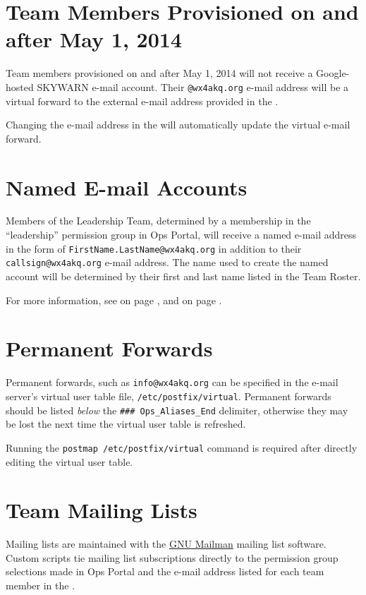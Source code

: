 \documentclass[pdflatex,letterpaper,twoside,12pt]{book}
\begin{document}
\section{Team Members Provisioned on and after May 1, 2014}

Team members provisioned on and after May 1, 2014 will not receive a Google-hosted SKYWARN e-mail account.  Their \texttt{@wx4akq.org} e-mail address will be a virtual forward to the external e-mail address provided in the .

Changing the e-mail address in the  will automatically update the virtual e-mail forward.

\section{Named E-mail Accounts}\label{named-email}

Members of the Leadership Team, determined by a membership in the ``leadership'' permission group in Ops Portal, will receive a named e-mail address in the form of \texttt{FirstName.LastName@wx4akq.org} in addition to their \texttt{callsign@wx4akq.org} e-mail address.  The name used to create the named account will be determined by their first and last name listed in the Team Roster.

For more information, see  on page \pageref{ops-manage-groups}, and  on page \pageref{team-roster}.

\section{Permanent Forwards}\label{perm-forwards}

Permanent forwards, such as \texttt{info@wx4akq.org} can be specified in the e-mail server's virtual user table file, \verb|/etc/postfix/virtual|.  Permanent forwards should be listed \emph{below} the \verb|### Ops_Aliases_End| delimiter, otherwise they may be lost the next time the virtual user table is refreshed.

Running the \verb|postmap /etc/postfix/virtual| command is required after directly editing the virtual user table.

\section{Team Mailing Lists}\label{mailing-lists}

Mailing lists are maintained with the \href{http://www.list.org/}{GNU Mailman} mailing list software.  Custom scripts tie mailing list subscriptions directly to the permission group selections made in Ops Portal and the e-mail address listed for each team member in the .
\end{document}
